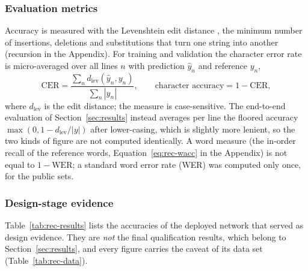 \subsubsection{Evaluation metrics}

Accuracy is measured with the Levenshtein edit distance \cite{levenshtein1966}, the minimum number of insertions, deletions and substitutions that turn one string into another (recursion in the Appendix).
For training and validation the character error rate is micro-averaged over all lines $n$ with prediction $\hat y_n$ and reference $y_n$,
\begin{equation}
\mathrm{CER}=\frac{\sum_nd_{\mathrm{lev}}(\hat y_n,y_n)}{\sum_n|y_n|},\qquad\text{character accuracy}=1-\mathrm{CER},
\label{eq:rec-cer}
\end{equation}
where $d_{\mathrm{lev}}$ is the edit distance; the measure is case-sensitive.
The end-to-end evaluation of Section~\ref{sec:results} instead averages per line the floored accuracy $\max(0,1-d_{\mathrm{lev}}/|y|)$ after lower-casing, which is slightly more lenient, so the two kinds of figure are not computed identically.
A word measure (the in-order recall of the reference words, Equation~\ref{eq:rec-wacc} in the Appendix) is not equal to $1-\mathrm{WER}$; a standard word error rate (WER) was computed only once, for the public sets.

\subsubsection{Design-stage evidence}

Table~\ref{tab:rec-results} lists the accuracies of the deployed network that served as design evidence.
They are \emph{not} the final qualification results, which belong to Section~\ref{sec:results}, and every figure carries the caveat of its data set (Table~\ref{tab:rec-data}).

